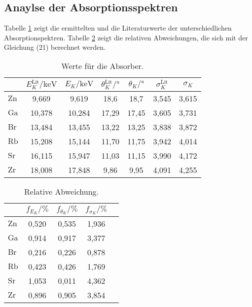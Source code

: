 \subsection{Anaylse der Absorptionsspektren}
Tabelle \ref{tab:Absorber} zeigt die ermittelten und die Literaturwerte \cite{XT} der unterschiedlichen Absorptionspektren. 
Tabelle \ref{tab:Abweichungabsorber} zeigt die relativen Abweichungen, die sich mit der Gleichung (21) berechnet werden.
\begin{table}[H]
    \centering
    \caption{Werte für die Absorber.}
    \label{tab:Absorber}
    \begin{tabular}{|l ||c|c || c|c || c|c| }
        \toprule
        {}  &$E{^{\text{Lit}}_K}/\mathrm{keV} $ & $E{_K}/\mathrm{keV} $   & $\theta{^{\text{Lit}}_K}/\mathrm{°}$  & $\theta{_K}/\mathrm{°}$  & $\sigma{^{\text{Lit}}_K}$ & $\sigma{_K}$ \\
        \midrule
        $\text{Zn}$&9,669&9,619&18,6&18,7&3,545&3,615\\
        $\text{Ga}$&10,378&10,284&17,29&17,45&3,605&3,731\\
        $\text{Br}$&13,484&13,455&13,22&13,25&3,838&3,872\\
        $\text{Rb}$&15,208&15,144&11,70&11,75&3,942&4,014\\
        $\text{Sr}$&16,115&15,947&11,03&11,15&3,990&4,172\\
        $\text{Zr}$&18,008&17,848&9,86&9,95&4,091&4,255\\
        \bottomrule
        \end{tabular}
\end{table}

\begin{table}[H]
    \centering
    \caption{Relative Abweichung.}
    \label{tab:Abweichungabsorber}
    \begin{tabular}{|l|c|c|c|c|}
        \toprule
        {} &$f_{E_K}/\mathrm{\%}$ &$f_{\theta_K}/\mathrm{\%}$ &$f_{\sigma_K}/\mathrm{\%}$  \\
        \midrule
        $\text{Zn}$&0,520&0,535&1,936\\
        $\text{Ga}$&0,914&0,917&3,377\\
        $\text{Br}$&0,216&0,226&0,878\\
        $\text{Rb}$&0,423&0,426&1,769\\
        $\text{Sr}$&1,053&0,011&4,362\\
        $\text{Zr}$&0,896&0,905&3,854\\

        \bottomrule
        \end{tabular}
\end{table}


